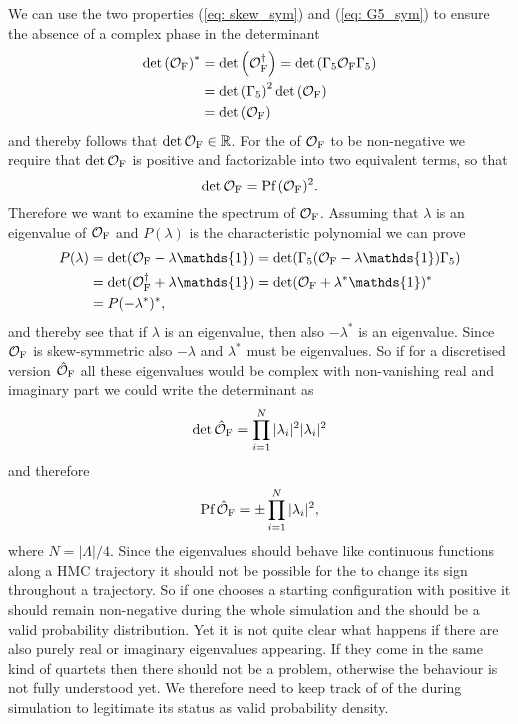 %
%
We can use the two properties (\ref{eq: skew_sym}) and (\ref{eq: G5_sym}) to ensure the absence of a complex phase in the determinant
%
%
\begin{align}
\det \left(\mathcal{O}_{\rm F}\right)^{*} &= \det  \left( \mathcal{O}_{\rm F}^{\dagger}\right) = \det \left( \Gamma_{5}\mathcal{O}_{\rm F} \Gamma_{5} \right) \notag \\
%
%
&= \det \left(\Gamma_{5}\right)^{2} \det \left(\mathcal{O}_{\rm F}\right) \\
%
%
&= \det \left(\mathcal{O}_{\rm F}\right) \notag
\end{align}
%
%
and thereby follows that $\det\mathcal{O}_{\rm F} \in \mathbb{R}$. For the  of $\mathcal{O}_{\rm F}$ to be non-negative we require that $\det \mathcal{O}_{\rm F}$ is positive and factorizable into two equivalent terms, so that
%
%
\begin{equation}
\det \mathcal{O}_{\rm F} = \text{Pf}\,(\mathcal{O}_{\rm F})^{2}.
\end{equation}
%
%
Therefore we want to examine the spectrum of $\mathcal{O}_{\rm F}$. Assuming that $\lambda$ is an eigenvalue of $\mathcal{O}_{\rm F}$ and $P(\lambda)$ is the characteristic polynomial we can prove
%
%
\begin{align}
P(\lambda) &= \det (\mathcal{O}_{\rm F} -\lambda\mathds{1}) = \det (\Gamma_{5}(\mathcal{O}_{\rm F} -\lambda\mathds{1})\Gamma_{5}) \notag \\
%
&= \det (\mathcal{O}_{\rm F}^{\dagger}+\lambda\mathds{1}) = \det (\mathcal{O}_{\rm F} +\lambda^{*}\mathds{1})^{*} \\
&= P(-\lambda^{*})^{*}, \notag
\end{align}
%
%
and thereby see that if $\lambda$ is an eigenvalue, then also $-\lambda^{*}$ is an eigenvalue. Since $\mathcal{O}_{\rm F}$ is skew-symmetric also $-\lambda$ and $\lambda^{*}$ must be eigenvalues. So if for a discretised version $\hat{\mathcal{O}}_{\rm F}$ all these eigenvalues would be complex with non-vanishing real and imaginary part we could write the determinant as
%
%
\begin{equation}
\det \hat{\mathcal{O}}_{\rm F} = \prod\limits_{i=1}^{N} \vert \lambda_{i}\vert^{2} \vert \lambda_{i} \vert^{2}
\end{equation}
%
%
and therefore
%
%
\begin{equation}
\text{Pf}\,\hat{\mathcal{O}}_{\rm F} =  \pm\prod\limits_{i=1}^{N} \vert \lambda_{i}\vert^{2},
\end{equation}
%
%
where $N=\vert \mathit{\Lambda}\vert /4$. Since the eigenvalues should behave like continuous functions along a HMC trajectory it should not be possible for the  to change its sign throughout a trajectory. So if one chooses a starting configuration with positive  it should remain non-negative during the whole simulation and the  should be a valid probability distribution. Yet it is not quite clear what happens if there are also purely real or imaginary eigenvalues appearing. If they come in the same kind of quartets then there should not be a problem, otherwise the behaviour is not fully understood yet. We therefore need to keep track of of the  during simulation to legitimate its status as valid probability density.
